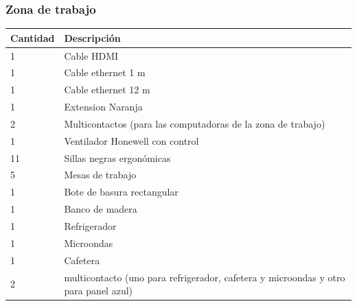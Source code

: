 \documentclass[a4paper,11pt]{article}                 %
\begin{document}
  \subsubsection*{Zona de trabajo}
    \begin{longtable}{|p{}|p{}|}
    \hline
    Cantidad & Descripción                                                  \\ \hline
    1        & Cable HDMI                                                   \\ \hline
    1        & Cable ethernet 1 m                                           \\ \hline
    1        & Cable ethernet 12 m                                          \\ \hline
    1        & Extension Naranja                                            \\ \hline
    2        & Multicontactos (para las computadoras de la zona de trabajo) \\ \hline
    1        & Ventilador Honewell con control                              \\ \hline
    11       & Sillas negras ergonómicas                                    \\ \hline
    5        & Mesas de trabajo                                             \\ \hline
    1        & Bote de basura rectangular                                   \\ \hline
    1        & Banco de madera                                              \\ \hline
    1        & Refrigerador                                                 \\ \hline
    1        & Microondas                                                   \\ \hline
    1        & Cafetera                                                     \\ \hline
    2        & multicontacto (uno para refrigerador, cafetera y microondas y otro para panel azul)     \\ \hline
    \end{longtable}
\end{document}

